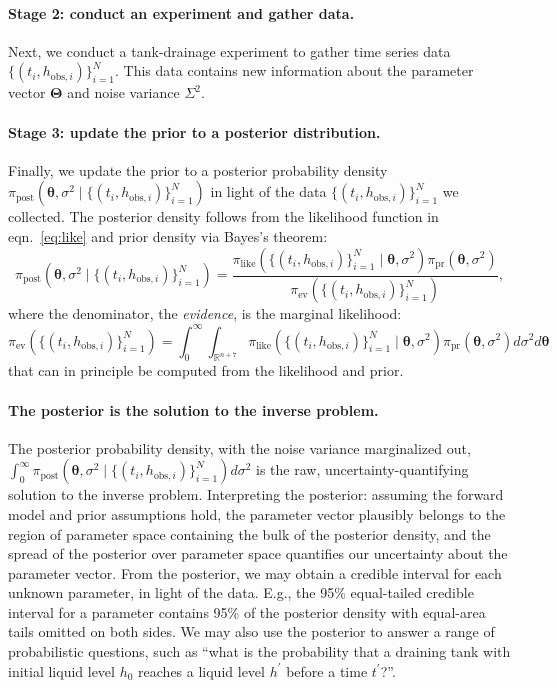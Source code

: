 \documentclass[openacc]{rsproca_new}%
\newcommand\thedata {$\{(t_i,h_{\text{obs}, i})\}_{i=1}^{N}$\xspace}
\newcommand\thedatanomath {\{(t_i,h_{\text{obs}, i})\}_{i=1}^{N}}
\begin{document}
\paragraph{Stage 2: conduct an experiment and gather data.}
Next, we conduct a tank-drainage experiment to gather time series data \thedata. This data contains new information about the parameter vector $\boldsymbol \Theta$ and noise variance $\Sigma^2$.

\paragraph{Stage 3: update the prior to a posterior distribution.}
Finally, we update the prior to a posterior probability density $\pi_{\text{post}}(\boldsymbol \theta, \sigma^2 \mid \thedatanomath)$ in light of the data \thedata we collected. 
The posterior density follows from the likelihood function in eqn.~\ref{eq:like} and prior density via Bayes's theorem:
\begin{equation}
	\pi_{\text{post}}(\boldsymbol \theta, \sigma^2 \mid \thedatanomath) = \frac{
	\pi_{\text{like}}(\thedatanomath \mid \boldsymbol \theta, \sigma^2 ) 
	\pi_{\text{pr}}(\boldsymbol \theta, \sigma^2)
	}{
	\pi_{\text{ev}}(\thedatanomath) 
	}, \label{eq:post}
\end{equation} where the denominator, the \emph{evidence}, is the marginal likelihood:
\begin{equation}
    \pi_{\text{ev}}(\thedatanomath) = \int_0^\infty \int_{\mathbb{R}^{n+7}} \pi_{\text{like}}(\thedatanomath \mid \boldsymbol \theta, \sigma^2 ) 
	\pi_{\text{pr}}(\boldsymbol \theta, \sigma^2) d\sigma^2 d \boldsymbol\theta
\end{equation}
that can in principle be computed from the likelihood and prior. 

\paragraph{The posterior is the solution to the inverse problem.}
The posterior probability density, with the noise variance marginalized out, $\int_0^\infty \pi_{\text{post}}(\boldsymbol \theta, \sigma^2 \mid \thedatanomath) d\sigma^2$ is the raw, uncertainty-quantifying solution to the inverse problem. Interpreting the posterior: assuming the forward model and prior assumptions hold, the parameter vector plausibly belongs to the region of parameter space containing the bulk of the posterior density, and the spread of the posterior over parameter space quantifies our uncertainty about the parameter vector. 
From the posterior, we may obtain a credible interval for each unknown parameter, in light of the data. E.g., the 95\% equal-tailed credible interval for a parameter contains 95\% of the posterior density with equal-area tails omitted on both sides. We may also use the posterior to answer a range of probabilistic questions, such as ``what is the probability that a draining tank with initial liquid level $h_0$ reaches a liquid level $h^\prime$ before a time $t^\prime$?''.
\end{document}
